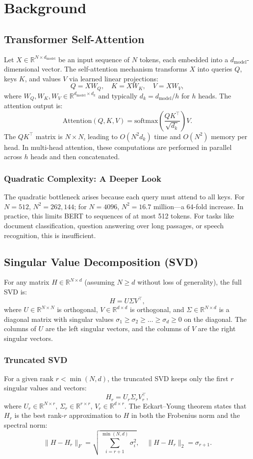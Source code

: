 \section{Background}
\subsection{Transformer Self-Attention}
Let $X \in \mathbb{R}^{N \times d_{\text{model}}}$ be an input sequence of $N$ tokens, each embedded into a $d_{\text{model}}$-dimensional vector. The self-attention mechanism transforms $X$ into queries $Q$, keys $K$, and values $V$ via learned linear projections:
\[
Q = X W_Q,\quad K = X W_K,\quad V = X W_V,
\]
where $W_Q, W_K, W_V \in \mathbb{R}^{d_{\text{model}} \times d_k}$ and typically $d_k = d_{\text{model}} / h$ for $h$ heads. The attention output is:
\[
\text{Attention}(Q,K,V) = \text{softmax}\left( \frac{Q K^\top}{\sqrt{d_k}} \right) V.
\]
The $QK^\top$ matrix is $N \times N$, leading to $O(N^2 d_k)$ time and $O(N^2)$ memory per head. In multi-head attention, these computations are performed in parallel across $h$ heads and then concatenated.

\subsubsection{Quadratic Complexity: A Deeper Look}
The quadratic bottleneck arises because each query must attend to all keys. For $N=512$, $N^2 = 262,144$; for $N=4096$, $N^2 = 16.7$ million—a 64-fold increase. In practice, this limits BERT to sequences of at most 512 tokens. For tasks like document classification, question answering over long passages, or speech recognition, this is insufficient.

\subsection{Singular Value Decomposition (SVD)}
For any matrix $H \in \mathbb{R}^{N \times d}$ (assuming $N \ge d$ without loss of generality), the full SVD is:
\[
H = U \Sigma V^\top,
\]
where $U \in \mathbb{R}^{N \times N}$ is orthogonal, $V \in \mathbb{R}^{d \times d}$ is orthogonal, and $\Sigma \in \mathbb{R}^{N \times d}$ is a diagonal matrix with singular values $\sigma_1 \ge \sigma_2 \ge \dots \ge \sigma_d \ge 0$ on the diagonal. The columns of $U$ are the left singular vectors, and the columns of $V$ are the right singular vectors.

\subsubsection{Truncated SVD}
For a given rank $r < \min(N,d)$, the truncated SVD keeps only the first $r$ singular values and vectors:
\[
H_r = U_r \Sigma_r V_r^\top,
\]
where $U_r \in \mathbb{R}^{N \times r}$, $\Sigma_r \in \mathbb{R}^{r \times r}$, $V_r \in \mathbb{R}^{d \times r}$. The Eckart–Young theorem states that $H_r$ is the best rank-$r$ approximation to $H$ in both the Frobenius norm and the spectral norm:
\[
\| H - H_r \|_F = \sqrt{\sum_{i=r+1}^{\min(N,d)} \sigma_i^2}, \quad
\| H - H_r \|_2 = \sigma_{r+1}.
\]

